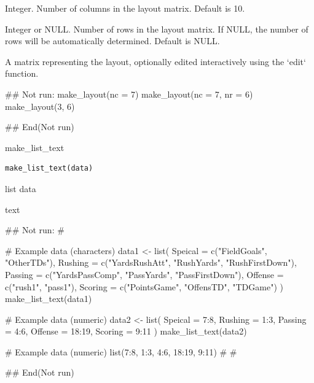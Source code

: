 \documentclass[a4paper]{book}
\begin{document}
%
\begin{Arguments}
\begin{ldescription}
\item[\code{nc}] Integer. Number of columns in the layout matrix. Default is 10.

\item[\code{nr}] Integer or NULL. Number of rows in the layout matrix. If NULL, the number of rows will be automatically determined. Default is NULL.
\end{ldescription}
\end{Arguments}
%
\begin{Value}
A matrix representing the layout, optionally edited interactively using the `edit` function.
\end{Value}
%
\begin{Examples}
\begin{ExampleCode}
## Not run: 
make_layout(nc = 7)
make_layout(nc = 7, nr = 6)
make_layout(3, 6)

## End(Not run)
\end{ExampleCode}
\end{Examples}
%
\begin{Description}
make\_list\_text
\end{Description}
%
\begin{Usage}
\begin{verbatim}
make_list_text(data)
\end{verbatim}
\end{Usage}
%
\begin{Arguments}
\begin{ldescription}
\item[\code{data}] list data
\end{ldescription}
\end{Arguments}
%
\begin{Value}
text
\end{Value}
%
\begin{Examples}
\begin{ExampleCode}

## Not run: 
#

# Example data (characters)
data1 <- list(
  Speical = c("FieldGoals", "OtherTDs"),
  Rushing = c("YardsRushAtt", "RushYards", "RushFirstDown"),
  Passing = c("YardsPassComp", "PassYards", "PassFirstDown"),
  Offense = c("rush1", "pass1"),
  Scoring = c("PointsGame", "OffensTD", "TDGame")
)
make_list_text(data1)

# Example data (numeric)
data2 <- list(
  Speical = 7:8,
  Rushing = 1:3,
  Passing = 4:6,
  Offense = 18:19,
  Scoring = 9:11
)
make_list_text(data2)



# Example data (numeric)
list(7:8, 1:3, 4:6, 18:19, 9:11)%
#
#

## End(Not run)


\end{ExampleCode}
\end{Examples}
\end{document}

